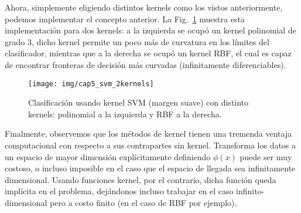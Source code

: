Ahora, simplemente eligiendo distintos kernels como los vistos anteriormente, podemos implementar el concepto anterior. La Fig.~\ref{fig:ksvm}  muestra esta implementación para dos kernels: a la izquierda se ocupó un kernel polinomial de grado $3$, dicho kernel permite un poco más de curvatura en los límites del clasificador, mientras que a la derecha se ocupó un kernel RBF, el cual es capaz de encontrar fronteras de decisión más curvadas (infinitamente diferenciables).

\begin{figure}[ht]
    \centering
    \texttt{[image: img/cap5\_svm\_2kernels]}
    \caption{Clasificación usando kernel SVM (margen suave) con distinto kernels: polinomial a la izquierda y RBF a la derecha.}
    \label{fig:ksvm}
\end{figure}


Finalmente, observemos que los métodos de kernel tienen una tremenda ventaja computacional con respecto a sus contrapartes sin kernel. Transforma los datos a un espacio de mayor dimensión explícitamente definiendo $\phi(x)$ puede ser muy costoso, o incluso imposible en el caso que el espacio de llegada sea infinitamente dimensional. Usando funciones kernel, por el contrario, dicha función queda implícita en el problema, dejándonos incluso trabajar en el caso infinito-dimensional pero a costo finito (en el caso de RBF por ejemplo).




